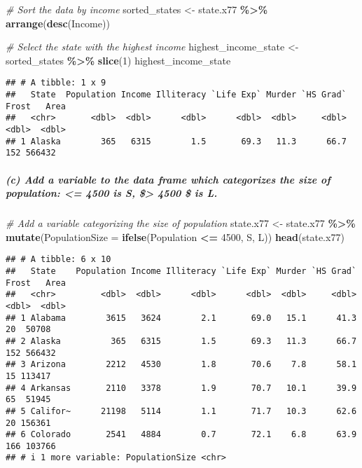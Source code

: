 \documentclass[
]{article}
\newenvironment{Shaded}{\begin{snugshade}}{\end{snugshade}}
\newcommand{\AttributeTok}[1]{\textcolor[rgb]{0.13,0.29,0.53}{#1}}
\newcommand{\CommentTok}[1]{\textcolor[rgb]{0.56,0.35,0.01}{\textit{#1}}}
\newcommand{\DecValTok}[1]{\textcolor[rgb]{0.00,0.00,0.81}{#1}}
\newcommand{\FunctionTok}[1]{\textcolor[rgb]{0.13,0.29,0.53}{\textbf{#1}}}
\newcommand{\NormalTok}[1]{#1}
\newcommand{\OtherTok}[1]{\textcolor[rgb]{0.56,0.35,0.01}{#1}}
\newcommand{\SpecialCharTok}[1]{\textcolor[rgb]{0.81,0.36,0.00}{\textbf{#1}}}
\newcommand{\StringTok}[1]{\textcolor[rgb]{0.31,0.60,0.02}{#1}}
\begin{document}
\begin{Shaded}
\begin{Highlighting}[]
\CommentTok{\# Sort the data by income}
\NormalTok{sorted\_states }\OtherTok{\textless{}{-}}\NormalTok{ state.x77 }\SpecialCharTok{\%\textgreater{}\%} \FunctionTok{arrange}\NormalTok{(}\FunctionTok{desc}\NormalTok{(Income))}

\CommentTok{\# Select the state with the highest income}
\NormalTok{highest\_income\_state }\OtherTok{\textless{}{-}}\NormalTok{ sorted\_states }\SpecialCharTok{\%\textgreater{}\%} \FunctionTok{slice}\NormalTok{(}\DecValTok{1}\NormalTok{)}
\NormalTok{highest\_income\_state}
\end{Highlighting}
\end{Shaded}

\begin{verbatim}
## # A tibble: 1 x 9
##   State  Population Income Illiteracy `Life Exp` Murder `HS Grad` Frost   Area
##   <chr>       <dbl>  <dbl>      <dbl>      <dbl>  <dbl>     <dbl> <dbl>  <dbl>
## 1 Alaska        365   6315        1.5       69.3   11.3      66.7   152 566432
\end{verbatim}

\subparagraph{(c) Add a variable to the data frame which categorizes the
size of population: \textless= 4500 is S, \$\textgreater{} 4500 \$ is
L.}\label{c-add-a-variable-to-the-data-frame-which-categorizes-the-size-of-population-4500-is-s-4500-is-l.}

\begin{Shaded}
\begin{Highlighting}[]
\CommentTok{\# Add a variable categorizing the size of population}
\NormalTok{state.x77 }\OtherTok{\textless{}{-}}\NormalTok{ state.x77 }\SpecialCharTok{\%\textgreater{}\%} 
  \FunctionTok{mutate}\NormalTok{(}\AttributeTok{PopulationSize =} \FunctionTok{ifelse}\NormalTok{(Population }\SpecialCharTok{\textless{}=} \DecValTok{4500}\NormalTok{, }\StringTok{\textquotesingle{}S\textquotesingle{}}\NormalTok{, }\StringTok{\textquotesingle{}L\textquotesingle{}}\NormalTok{))}
\FunctionTok{head}\NormalTok{(state.x77)}
\end{Highlighting}
\end{Shaded}

\begin{verbatim}
## # A tibble: 6 x 10
##   State    Population Income Illiteracy `Life Exp` Murder `HS Grad` Frost   Area
##   <chr>         <dbl>  <dbl>      <dbl>      <dbl>  <dbl>     <dbl> <dbl>  <dbl>
## 1 Alabama        3615   3624        2.1       69.0   15.1      41.3    20  50708
## 2 Alaska          365   6315        1.5       69.3   11.3      66.7   152 566432
## 3 Arizona        2212   4530        1.8       70.6    7.8      58.1    15 113417
## 4 Arkansas       2110   3378        1.9       70.7   10.1      39.9    65  51945
## 5 Califor~      21198   5114        1.1       71.7   10.3      62.6    20 156361
## 6 Colorado       2541   4884        0.7       72.1    6.8      63.9   166 103766
## # i 1 more variable: PopulationSize <chr>
\end{verbatim}
\end{document}
